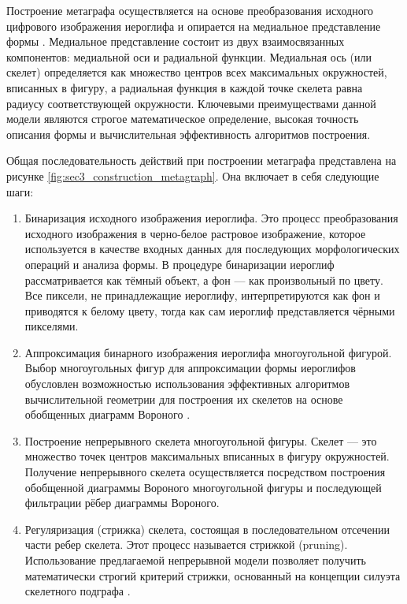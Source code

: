 Построение метаграфа осуществляется на основе преобразования исходного цифрового изображения иероглифа и опирается на медиальное представление формы \cite{siddiqi2008medial}. Медиальное представление состоит из двух взаимосвязанных компонентов: медиальной оси и радиальной функции. Медиальная ось (или скелет) определяется как множество центров всех максимальных окружностей, вписанных в фигуру, а радиальная функция в каждой точке скелета равна радиусу соответствующей окружности. Ключевыми преимуществами данной модели являются строгое математическое определение, высокая точность описания формы и вычислительная эффективность алгоритмов построения.

Общая последовательность действий при построении метаграфа представлена на рисунке \cref{fig:sec3_construction_metagraph}. Она включает в себя следующие шаги:
\begin{enumerate}
    \item Бинаризация исходного изображения иероглифа. Это процесс преобразования исходного изображения в черно-белое растровое изображение, которое используется в качестве входных данных для последующих морфологических операций и анализа формы. В процедуре бинаризации иероглиф рассматривается как тёмный объект, а фон — как произвольный по цвету. Все пиксели, не принадлежащие иероглифу, интерпретируются как фон и приводятся к белому цвету, тогда как сам иероглиф представляется чёрными пикселями.
    \item Аппроксимация бинарного изображения иероглифа многоугольной фигурой. Выбор многоугольных фигур для аппроксимации формы иероглифов обусловлен возможностью использования эффективных алгоритмов вычислительной геометрии для построения их скелетов на основе обобщенных диаграмм Вороного \cite{siddiqi2008medial}.
    \item Построение непрерывного скелета многоугольной фигуры. Скелет — это множество точек центров максимальных вписанных в фигуру окружностей. Получение непрерывного скелета осуществляется посредством построения обобщенной диаграммы Вороного многоугольной фигуры и последующей фильтрации рёбер диаграммы Вороного.
    \item Регуляризация (стрижка) скелета, состоящая в последовательном отсечении части ребер скелета. Этот процесс называется стрижкой (pruning). Использование предлагаемой непрерывной модели позволяет получить математически строгий критерий стрижки, основанный на концепции силуэта скелетного подграфа \cite{LM2016continuous}.
\end{enumerate}


